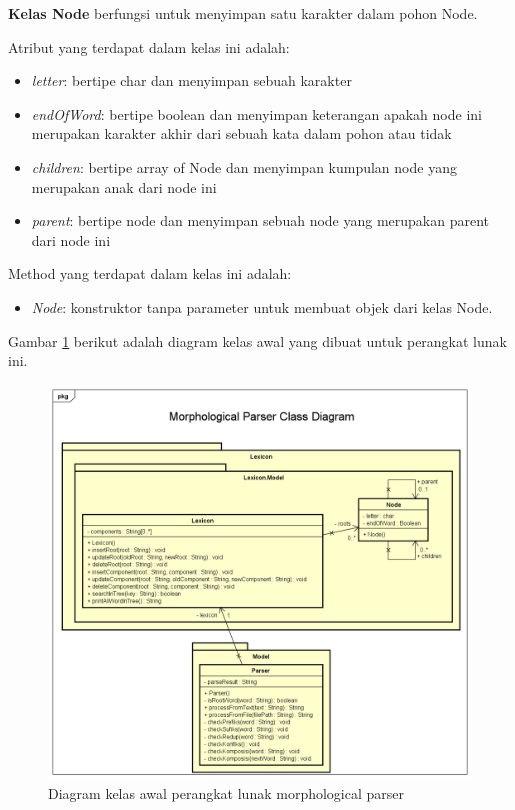 \textbf{Kelas Node} berfungsi untuk menyimpan satu karakter dalam pohon Node.

Atribut yang terdapat dalam kelas ini adalah:

\begin{itemize}
	\item \textit{letter}: bertipe char dan menyimpan sebuah karakter
	\item \textit{endOfWord}: bertipe boolean dan menyimpan keterangan apakah node ini merupakan karakter akhir dari sebuah kata dalam pohon atau tidak
	\item \textit{children}: bertipe array of Node dan menyimpan kumpulan node yang merupakan anak dari node ini
	\item \textit{parent}: bertipe node dan menyimpan sebuah node yang merupakan parent dari node ini
\end{itemize}

Method yang terdapat dalam kelas ini adalah:

\begin{itemize}
	\item \textit{Node}: konstruktor tanpa parameter untuk membuat objek dari kelas Node.
\end{itemize}

Gambar \ref{gambar-diagram-kelas-awal} berikut adalah diagram kelas awal yang dibuat untuk perangkat lunak ini.

\begin{figure}[H]
\centering
\includegraphics[scale=0.4]{Gambar/gambar-diagram-kelas-awal}
\caption{Diagram kelas awal perangkat lunak morphological parser} 
\label{gambar-diagram-kelas-awal}
\end{figure}